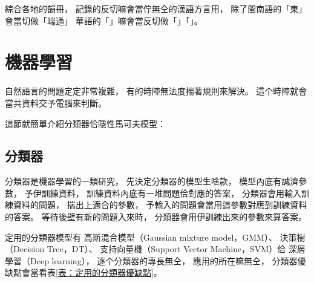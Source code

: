 綜合各地的韻冊，
記錄的反切嘛會當佇無仝的漢語方言用，
除了閩南語的「東」會當切做「端通」
華語的「」嘛會當反切做「」「」。








%

%


\section{機器學習}
\label{節：機器學習}
自然語言的問題定定非常複雜，
有的時陣無法度揣著規則來解決。
這个時陣就會當共資料交予電腦來判斷。

這節就簡單介紹分類器佮隱性馬可夫模型：

\subsection{分類器}
\label{小節：分類器}
分類器是機器學習的一類研究，
先決定分類器的模型生啥款，
模型內底有誠濟參數，
予伊訓練資料，
訓練資料內底有一堆問題佮對應的答案，
分類器會用輸入訓練資料的問題，
揣出上適合的參數， 
予輸入的問題會當用這參數對應到訓練資料的答案。
等待後壁有新的問題入來時，
分類器會用伊訓練出來的參數來算答案。

定用的分類器模型有
高斯混合模型（Gaussian mixture model，GMM）、
決策樹（Decision Tree，DT）、
支持向量機（Support Vector Machine，SVM）佮
深層學習（Deep learning），
逐个分類器的專長無仝，
應用的所在嘛無仝，
分類器優缺點會當看表\ref{表：定用的分類器優缺點}。

